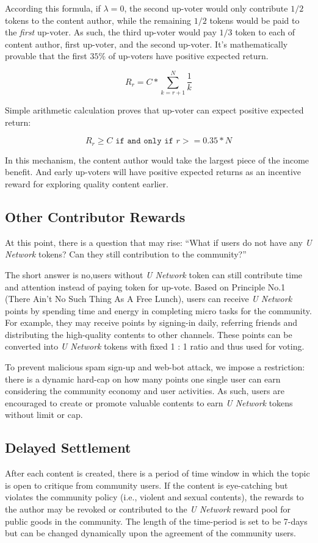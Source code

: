 According this formula, if $\lambda = 0$, the second up-voter would only contribute $1/2$ tokens to the content author, while the remaining $1/2$ tokens would be paid to the \emph{first} up-voter. As such, the third up-voter would pay $1/3$ token to each of content author, first up-voter, and the second up-voter. It's mathematically provable that the first $35\%$ of up-voters have positive expected return.     
\begin{center}
$$R_r = C * \sum_{k=r+1}^{N} \frac{1}{k}$$ 
\end{center}
Simple arithmetic calculation proves that up-voter can expect positive expected return:
\begin{center}
$$R_r \geq C \texttt{ if and only if } {r}>=0.35*{N} $$
\end{center}
In this mechanism, the content author would take the largest piece of the income benefit. And early up-voters will have positive expected returns as an incentive reward for exploring quality content earlier. 


\subsection{Other Contributor Rewards}
At this point, there is a question that may rise: ``What if users do not have any \emph{U Network}  tokens? Can they still contribution to the community?''

The short answer is no,users without \emph{U Network}  token can still contribute time and attention instead of paying token for up-vote. Based on Principle No.1 (There Ain't No Such Thing As A Free Lunch), users can receive \emph{U Network}  points by spending time and energy in completing micro tasks for the community. For example, they may receive points by signing-in daily, referring friends and distributing the high-quality contents to other channels. These points can be converted into \emph{U Network}  tokens with fixed 1 : 1 ratio and thus used for voting.  

To prevent malicious spam sign-up and web-bot attack, we impose a restriction: there is a dynamic hard-cap on how many points one single user can earn considering the community economy and user activities. As such, users are encouraged to create or promote valuable contents to earn \emph{U Network} tokens without limit or cap. 

\subsection{Delayed Settlement}
After each content is created, there is a period of time window in which the topic is open to critique from community users. If the content is eye-catching but violates the community policy (i.e., violent and sexual contents), the rewards to the author may be revoked or contributed to the \emph{U Network} reward pool for public goods in the community. The length of the time-period is set to be 7-days but can be changed dynamically upon the agreement of the community users.

